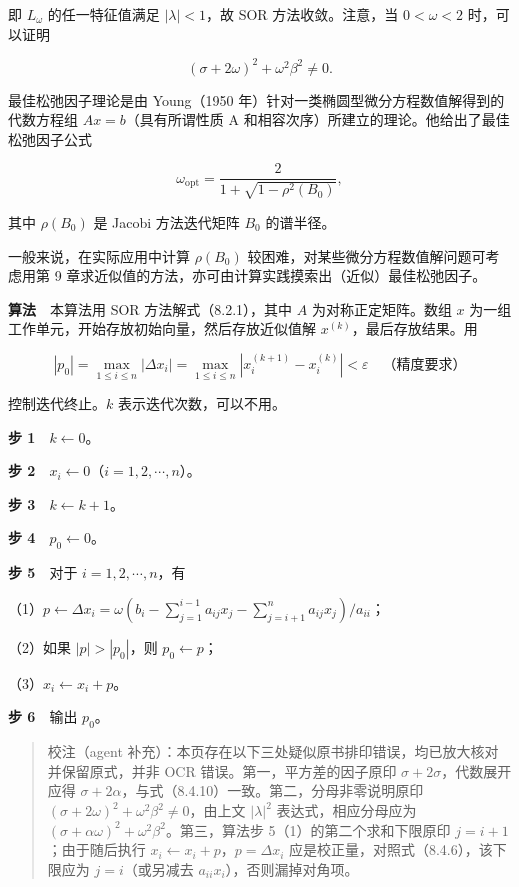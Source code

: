 \documentclass[
  10pt,
  fontset=fandol]{ctexart}
\begin{document}
即 \(L_\omega\) 的任一特征值满足 \(|\lambda|<1\)，故 SOR 方法收敛。注意，当 \(0<\omega<2\) 时，可以证明

\[
(\sigma+2\omega)^2+\omega^2\beta^2\neq0.
\]

最佳松弛因子理论是由 Young（1950 年）针对一类椭圆型微分方程数值解得到的代数方程组 \(Ax=b\)（具有所谓性质 A 和相容次序）所建立的理论。他给出了最佳松弛因子公式

\[
\omega_{\mathrm{opt}}=\frac2{1+\sqrt{1-\rho^2(B_0)}},
\]

其中 \(\rho(B_0)\) 是 Jacobi 方法迭代矩阵 \(B_0\) 的谱半径。

一般来说，在实际应用中计算 \(\rho(B_0)\) 较困难，对某些微分方程数值解问题可考虑用第 9 章求近似值的方法，亦可由计算实践摸索出（近似）最佳松弛因子。

\textbf{算法}　本算法用 SOR 方法解式（8.2.1），其中 \(A\) 为对称正定矩阵。数组 \(x\) 为一组工作单元，开始存放初始向量，然后存放近似值解 \(x^{(k)}\)，最后存放结果。用

\[
|p_0|=\max_{1\leqslant i\leqslant n}|\Delta x_i|=\max_{1\leqslant i\leqslant n}|x_i^{(k+1)}-x_i^{(k)}|<\varepsilon\quad\text{（精度要求）}
\]

控制迭代终止。\(k\) 表示迭代次数，可以不用。

\textbf{步 1}　\(k\leftarrow0\)。

\textbf{步 2}　\(x_i\leftarrow0\)（\(i=1,2,\cdots,n\)）。

\textbf{步 3}　\(k\leftarrow k+1\)。

\textbf{步 4}　\(p_0\leftarrow0\)。

\textbf{步 5}　对于 \(i=1,2,\cdots,n\)，有

（1）\(p\leftarrow\Delta x_i=\omega\left(b_i-\displaystyle\sum_{j=1}^{i-1}a_{ij}x_j-\displaystyle\sum_{j=i+1}^n a_{ij}x_j\right)/a_{ii}\)；

（2）如果 \(|p|>|p_0|\)，则 \(p_0\leftarrow p\)；

（3）\(x_i\leftarrow x_i+p\)。

\textbf{步 6}　输出 \(p_0\)。

\begin{quote}
校注（agent 补充）：本页存在以下三处疑似原书排印错误，均已放大核对并保留原式，并非 OCR 错误。第一，平方差的因子原印 \(\sigma+2\sigma\)，代数展开应得 \(\sigma+2\alpha\)，与式（8.4.10）一致。第二，分母非零说明原印 \((\sigma+2\omega)^2+\omega^2\beta^2\neq0\)，由上文 \(|\lambda|^2\) 表达式，相应分母应为 \((\sigma+\alpha\omega)^2+\omega^2\beta^2\)。第三，算法步 5（1）的第二个求和下限原印 \(j=i+1\)；由于随后执行 \(x_i\leftarrow x_i+p\)，\(p=\Delta x_i\) 应是校正量，对照式（8.4.6），该下限应为 \(j=i\)（或另减去 \(a_{ii}x_i\)），否则漏掉对角项。
\end{quote}
\end{document}
